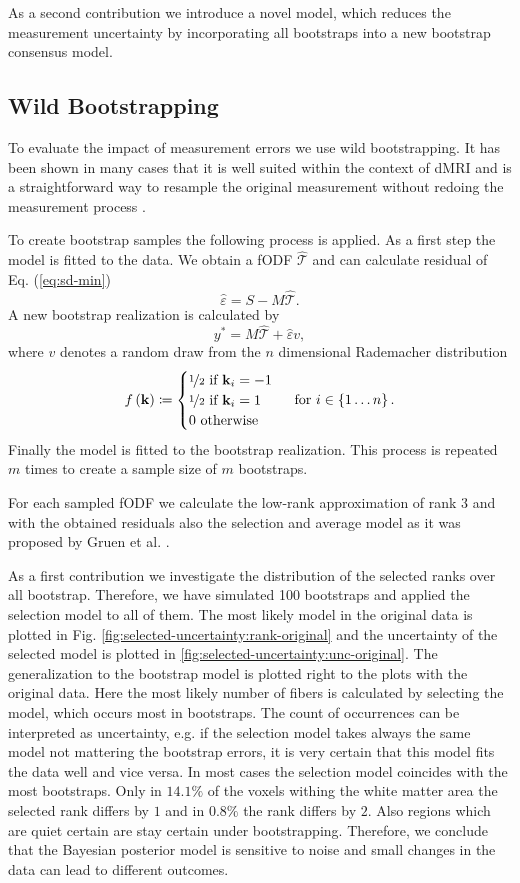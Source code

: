 As a second contribution we introduce a novel model, which reduces the measurement
uncertainty by incorporating all bootstraps into a new bootstrap consensus model.

\subsection{Wild Bootstrapping}
To evaluate the impact of measurement errors we use wild bootstrapping. It
has been shown in many cases that it is well suited within the context of dMRI and
is a straightforward way to
resample the original measurement without redoing the measurement process
\cite{Jones:2008}.

To create bootstrap samples the following process is applied. As a first step the model is fitted to the data. We obtain a fODF
$\hat{\mathcal{T}}$ and can calculate residual of Eq. (\ref{eq:sd-min}) 
\[ \hat{\varepsilon} = S - M\hat{\mathcal{T}} .\] 
A new bootstrap realization is calculated by 
\[ y^{*} = M\hat{\mathcal{T}}  + \hat{\varepsilon} v , \]
where $v$ denotes a random draw from the $n$ dimensional Rademacher distribution
\[ f \left( \mathbf{k} \right) \coloneqq  \begin{cases} \nicefrac{1}{2} \text{ if }
		\mathbf{k}_i=-1 \\
		\nicefrac{1}{2} \text{ if } \mathbf{k}_i=1 \\
		0 \text { otherwise } 
\end{cases} \text{ for } i \in \left\{ 1\dots n \right\} . \]
 Finally the model is fitted to the bootstrap realization. This process is repeated $m$
times to create a sample size of $m$ bootstraps.

For each sampled fODF we calculate the low-rank approximation of rank $3$
and with the obtained residuals also the selection and average model as it was
proposed by Gruen et al. \cite{Gruen:2021}.

As a first contribution we investigate the distribution of the selected ranks
over all bootstrap. Therefore, we have simulated 100 bootstraps and applied the
selection model to all of them. The most
likely model in the original data is plotted in Fig.
\ref{fig:selected-uncertainty:rank-original} and the uncertainty of the selected model is
plotted in \ref{fig:selected-uncertainty:unc-original}. The generalization to the bootstrap model is
plotted right to the plots with the original data. Here the most likely number of fibers is
calculated by selecting the model, which occurs most in bootstraps. The count of
occurrences can be interpreted as uncertainty, e.g. if the selection model takes
always the same model not mattering the bootstrap errors, it is very certain
that this model fits the data well and vice versa.  
In most cases the selection model coincides with the most bootstraps. Only in
$14.1\%$ of the voxels withing the white matter area the selected rank differs
by $1$ and in $0.8\%$ the rank differs by $2$. Also regions which are quiet
certain are stay certain under bootstrapping. Therefore, we conclude that the
Bayesian posterior model is sensitive to noise and small changes in the data can
lead to different outcomes. 


